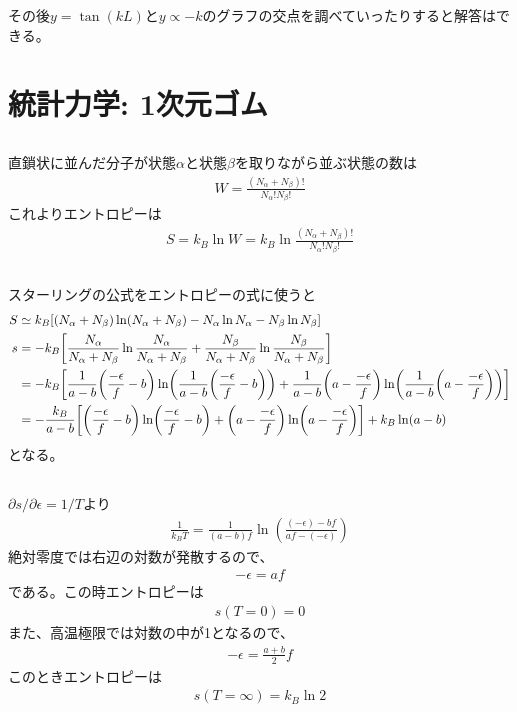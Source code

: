 \documentclass[../../master.tex]{subfiles}
\begin{document}
その後\(y=\tan(kL)\)と\(y\propto -k\)のグラフの交点を調べていったりすると解答はできる。

\section{統計力学: 1次元ゴム}
\subsection{}
直鎖状に並んだ分子が状態\(\alpha\)と状態\(\beta\)を取りながら並ぶ状態の数は
\begin{align}
    W = \frac{(N_\alpha+N_\beta)!}{N_\alpha!N_\beta!}
\end{align}
これよりエントロピーは
\begin{align}
    S = k_B \ln W  = k_B\ln \frac{(N_\alpha+N_\beta)!}{N_\alpha!N_\beta!}
\end{align}

\subsection{}
スターリングの公式をエントロピーの式に使うと
\begin{align}
    S &\simeq k_B\qty[(N_\alpha+N_\beta)\ln(N_\alpha+N_\beta)-N_\alpha\ln N_\alpha - N_\beta\ln N_\beta]\\
    s &= -k_B\qty[\frac{N_\alpha}{N_\alpha+N_\beta}\ln\frac{N_\alpha}{N_\alpha+N_\beta}
        +\frac{N_\beta}{N_\alpha+N_\beta} \ln\frac{N_\beta}{N_\alpha+N_\beta}]\\
    &= -k_B \qty[\frac{1}{a-b}\qty(\frac{-\epsilon}{f}-b)\ln(\frac{1}{a-b}\qty(\frac{-\epsilon}{f}-b))
    +\frac{1}{a-b}\qty(a-\frac{-\epsilon}{f})\ln(\frac{1}{a-b}\qty(a-\frac{-\epsilon}{f}))]\\
    &= -\frac{k_B}{a-b}\qty[
        \qty(\frac{-\epsilon}{f}-b)\ln(\frac{-\epsilon}{f}-b)
    +\qty(a-\frac{-\epsilon}{f})\ln(a-\frac{-\epsilon}{f})
    ] + k_B \ln(a-b)
\end{align}
となる。

\subsection{}
\(\partial s/\partial \epsilon = 1/T\)より
\begin{align}
    \frac{1}{k_BT} = \frac{1}{(a-b)f}\ln(\frac{(-\epsilon)-bf}{af-(-\epsilon)})
\end{align}
絶対零度では右辺の対数が発散するので、
\begin{align}
    -\epsilon =af
\end{align}
である。この時エントロピーは
\begin{align}
    s(T=0) = 0
\end{align}
また、高温極限では対数の中が1となるので、
\begin{align}
    -\epsilon = \frac{a+b}{2}f
\end{align}
このときエントロピーは
\begin{align}
    s(T=\infty) = k_B\ln2
\end{align}
\end{document}

